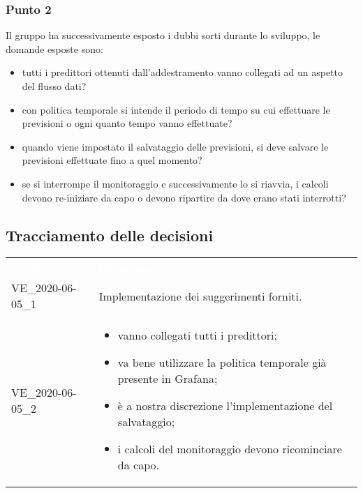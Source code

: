 \subsubsection{Punto 2}
Il gruppo ha successivamente esposto i dubbi sorti durante lo sviluppo, le domande esposte sono:
\begin{itemize}
\item tutti i predittori ottenuti dall'addestramento vanno collegati ad un aspetto del flusso dati?
\item con politica temporale si intende il periodo di tempo su cui effettuare le previsioni o ogni quanto tempo vanno effettuate?
\item quando viene impostato il salvataggio delle previsioni, si deve salvare le previsioni effettuate fino a quel momento?
\item se si interrompe il monitoraggio e successivamente lo si riavvia, i calcoli devono re-iniziare da capo o devono ripartire da dove erano stati interrotti?
\end{itemize}

\pagebreak
\subsection{Tracciamento delle decisioni}
\centering
\begin{longtable}{ C{4cm}  C{12cm} }
\textcolor{white}{\textbf{Codice}} & \textcolor{white}{\textbf{Decisione}}\\	
		VE\_2020-06-05\_1 & Implementazione dei suggerimenti forniti. \\
		VE\_2020-06-05\_2 & \begin{itemize}
	\item vanno collegati tutti i predittori;
	\item va bene utilizzare la politica temporale già presente in Grafana;
	\item è a nostra discrezione l'implementazione del salvataggio;
	\item i calcoli del monitoraggio devono ricominciare da capo.
\end{itemize}\\ 


\end{longtable}




